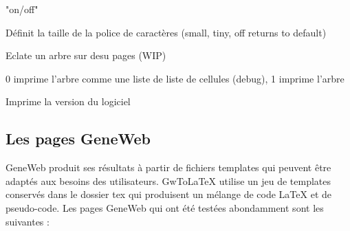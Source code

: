 \begin{description}[style=nextline]
\item["Arbres"/"Trees"] "on/off"
\item["FontSize"] Définit la taille de la police de caractères\label{fontsize}
(small, tiny, off returns to default)
\item["TwoPages"] Eclate un arbre sur desu pages (WIP)
\item["TreeMode"] 0 imprime l'arbre comme une liste de liste de cellules (debug),
 1 imprime l'arbre

\item["Version"] Imprime la version du logiciel
\end{description}

\subsection{Les pages GeneWeb}

GeneWeb produit ses résultats à partir de fichiers templates qui peuvent être
adaptés aux besoins des utilisateurs.
GwToLaTeX utilise un jeu de templates conservés dans le dossier tex qui
produisent un mélange de code LaTeX et de pseudo-code.
Les pages GeneWeb qui ont été testées abondamment sont les suivantes :

